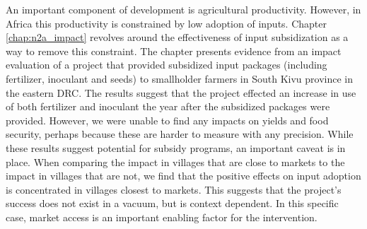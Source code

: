 An important component of development is agricultural productivity. However, in Africa this productivity is constrained by low adoption of inputs. Chapter \ref{chap:n2a_impact} revolves around the effectiveness of input subsidization as a way to remove this constraint. The chapter presents evidence from an impact evaluation of a project that provided subsidized input packages (including fertilizer, inoculant and seeds) to smallholder farmers in South Kivu province in the eastern DRC. The results suggest that the project effected an increase in use of both fertilizer and inoculant the year after the subsidized packages were provided. However, we were unable to find any impacts on yields and food security, perhaps because these are harder to measure with any precision. While these results suggest potential for subsidy programs, an important caveat is in place. When comparing the impact in villages that are close to markets to the impact in villages that are not, we find that the positive effects on input adoption is concentrated in villages closest to markets. This suggests that the project's success does not exist in a vacuum, but is context dependent. In this specific case, market access is an important enabling factor for the intervention.

